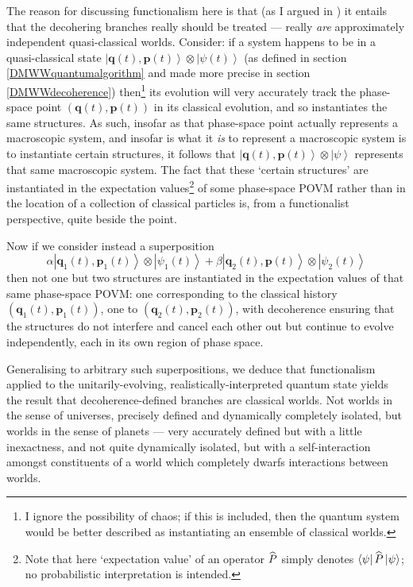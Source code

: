 \documentclass[12pt]{article}
\newcommand{\be}{\begin{equation}}
\newcommand{\ee}{\end{equation}}
\newcommand{\vctr}[1]{\ensuremath{\mathbf{ #1 }}}
\newcommand{\ket}[1]{\ensuremath{\left|  #1 \right\rangle}}
\newcommand{\bra}[1]{\ensuremath{\left\langle #1 \right|}}
\newcommand{\tpk}[2]{\ensuremath{\ket{#1}\!\otimes\!\ket{#2}}}
\newcommand{\matel}[3]{\ensuremath{\bra{#1} #2 \ket{#3}}}
\newcommand{\op}[1]{\ensuremath{\widehat{\textsf{\ensuremath{#1}}}}}
\begin{document}
The reason for discussing functionalism here is that (as I argued in ) it entails that the decohering branches really should be treated --- really \emph{are} approximately independent quasi-classical worlds. Consider: if a system happens to be in a quasi-classical state
$\tpk{\vctr{q}(t),\vctr{p}(t)}{\psi(t)}$ (as defined in section \ref{DMWWquantumalgorithm} and made more precise in section \ref{DMWWdecoherence}) then\footnote{I ignore the possibility of chaos; if this is included, then the quantum system would be better described as instantiating an ensemble of classical worlds.} its evolution will very accurately track the phase-space point $(\vctr{q}(t),\vctr{p}(t))$ in its classical evolution, and so instantiates the same structures. As such, insofar as that phase-space point actually represents a macroscopic system, and insofar is what it \emph{is} to represent a macroscopic system is to instantiate certain structures, it follows that $\tpk{\vctr{q}(t),\vctr{p}(t)}{\psi}$ represents that same macroscopic system. The fact that these `certain structures' are instantiated in the expectation values\footnote{Note that here `expectation value' of an operator $\op{P}$ simply denotes \matel{\psi}{\op{P}}{\psi}; no probabilistic interpretation is intended. } of some phase-space POVM rather than in the location of a collection of classical particles is, from a functionalist perspective, quite beside the point.

Now if we consider instead a superposition
\be \label{DMWWtwostructures}
\alpha\tpk{\vctr{q}_1(t),\vctr{p}_1(t)}{\psi_1(t)}+\beta\tpk{\vctr{q}_2(t),\vctr{p}(t)}{\psi_2(t)}
\ee
then not one but two structures are instantiated in the expectation values of that same phase-space POVM: one corresponding to the classical history $(\vctr{q}_1(t),\vctr{p}_1(t))$, one to $(\vctr{q}_2(t),\vctr{p}_2(t))$, with decoherence ensuring that the structures do not interfere and cancel each other out but continue to evolve independently, each in its own region of phase space. 

Generalising to arbitrary such superpositions, we deduce that functionalism applied to the unitarily-evolving, realistically-interpreted quantum state yields the result that decoherence-defined branches are classical worlds. Not worlds in the sense of universes, precisely defined and dynamically completely isolated, but worlds in the sense of planets --- very accurately defined but with a little inexactness, and not quite dynamically isolated, but with a self-interaction amongst constituents of a world which completely dwarfs interactions between worlds.
\end{document}
